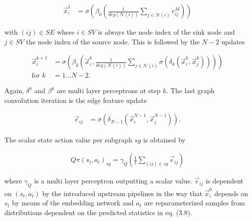 \begin{align}
\vec{x}_i^1 &= \sigma \left( \beta_0 \left(\frac{1}{deg(\mathcal{N}(i))} \sum_{j \in \mathcal{N}(i)}  e_{ij}^M\right)\right)
\end{align}

with $(ij)\in SE$ where $i \in SV$ is always the node index of the sink node and $j \in SV$ the node index of the source node.
This is followed by the $N-2$ updates

\begin{align}
\vec{x}_i^{k+1} &= \sigma \left( \beta_k \left(\vec{x}_i^k, \frac{1}{deg(\mathcal{N}(i))} \sum_{j \in \mathcal{N}(i)}  \sigma \left( \delta_k \left(\vec{x}_i^k, \vec{x}_j^k\right)\right) \right)\right)\\
\text{for }k&=1...N-2 .
\end{align}

Again, $\delta^k$ and $\beta^k$ are multi layer perceptrons at step $k$. The last graph convolution iteration is the edge feature update

\begin{align}
\vec{e}_{ij} &= \sigma \left( \delta_{N-1} \left(\vec{x}_i^{N-1}, \vec{x}_j^{N-1} \right)\right) .
\end{align}

The scalar state action value per subgraph $sg$ is obtained by

\begin{align}
	Q\pi(s_t, a_t)_{sg} = \gamma_{Q}\left( \frac{1}{l} \sum_{(ij)\in sg} \vec{e}_{ij} \right)
\end{align}

where $\gamma_{Q}$ is a multi layer perceptron outputting a scalar value. $\vec{e}_{ij}$ is dependent on $(s_t, a_t)$ by the introduced upstream pipelines in the way that $\vec{x}^0_i$ depends on $s_t$ by means of the embedding network and $a_t$ are reparameterized samples from distributions dependent on the predicted statistics in eq. (3.8).